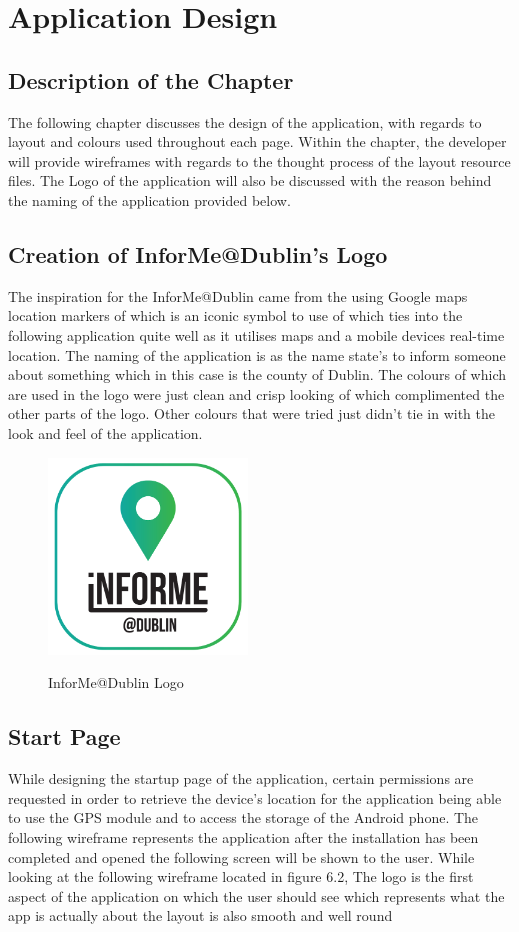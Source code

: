 \chapter{Application Design}

\section{Description of the Chapter}
The following chapter discusses the design of the application, with regards to layout and colours used throughout each page. Within the chapter, the developer will provide wireframes with regards to the thought process of the layout resource files. The Logo of the application will also be discussed with the reason behind the naming of the application provided below.

\section{Creation of InforMe@Dublin's Logo}
The inspiration for the InforMe@Dublin came from the using Google maps location markers of which is an iconic symbol to use of which ties into the following application quite well as it utilises maps and a mobile devices real-time location. The naming of the application is as the name state's to inform someone about something which in this case is the county of Dublin. The colours of which are used in the logo were just clean and crisp looking of which complimented the other parts of the logo. Other colours that were tried just didn't tie in with the look and feel of the application.

\begin{figure}[htbp]
	\center \includegraphics[width=150pt]{informe}\\
	\caption{InforMe@Dublin Logo} \label{Figure: InforMe@Dublin Logo}
\end{figure}
\newpage
\section{Start Page}
While designing the startup page of the application, certain permissions are requested in order to retrieve the device's location for the application being able to use the GPS module and to access the storage of the Android phone. The following wireframe represents the application after the installation has been completed and opened the following screen will be shown to the user. While looking at the following wireframe located in figure 6.2, The logo is the first aspect of the application on which the user should see which represents what the app is actually about the layout is also smooth and well round

